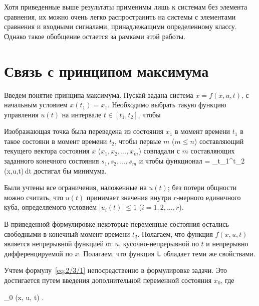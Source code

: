 \br

Хотя приведенные выше результаты применимы лишь к системам без элемента сравнения, их можно очень легко распространить на системы с элементами сравнения и входными сигналами, принадлежащими определенному классу. Однако такое обобщение остается за рамками этой работы.



\section{Связь с принципом максимума}




Введем понятие принципа максимума. Пускай задана система $\dot{x} = f(x, u, t)$, с начальным условием $x(t_1) = x_1$. Необходимо выбрать такую функцию управления $u(t)$ на интервале $t \in [t_1, t_2]$, чтобы

\benum
	\item
		Изображающая точка была переведена из состояния $x_1$ в момент времени $t_1$ в такое состояни в момент времени $t_2$, чтобы первые $m$ ($m \leqslant n$) составляющий текущего вектора состояния $x$ ($x_1, x_2, \ldots, x_m$) совпадали с $m$ составляющих заданного конечного состояния $s_1, s_2, \ldots, s_m$ и чтобы функционал
			\funcF = \int\limits_{t_1}^{t_2} \funcL(x,u,t)\,dt
		\eeq
		достигал бы минимума.
		
	\item
		Были учтены все ограничения, наложенные на $u(t)$; без потери общности можно считать, что $u(t)$ принимает значения внутри $r$-мерного единичного куба, определяемого условием $|u_i(t)| \leqslant 1$ ($i = 1,2,\ldots,r$).
\eenum

В приведенной формулировке некоторые переменные состояния остались свободными в конечный момент времени $t_2$. Полагаем, что функция $f(x, u, t)$ является непрерывной функцией от $u$, кусочно-непрерывной по $t$ и непрерывно дифференцируемой по $x$. Полагаем, что функция $\mathsf{L}$ обладает теми же свойствами.

Учтем формулу~\ref{eq:2/3/1} непосредственно в формулировке задачи. Это достигается путем введения дополнительной переменной состояния $x_0$, где

    _0 \equiv \funcL(x, u, t) \mbox{.}
\eeq

